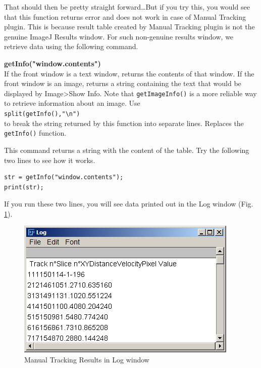 \documentclass[11pt,a4paper,oneside]{report}
\newenvironment{indentCom}%
{\begin{list}{}%
         {\setlength{\leftmargin}{1em}}%
         \item[]%
}
{\end{list}}
\newcommand{\ilcom}[1]{\texttt{\small#1}}
\begin{document}
That should then be pretty straight forward\ldots But if you try this, you would see that this function returns error and does not work in case of Manual Tracking plugin. This is because result table created by Manual Tracking plugin is not the genuine ImageJ Results window. For such non-genuine results window, we retrieve data using the following command. 
\begin{indentCom}
\textbf{getInfo("window.contents")}\\
If the front window is a text window, returns the contents of that window. If the front window is an image, returns a string containing the text that would be displayed by Image>Show Info. Note that \ilcom{getImageInfo()} is a more reliable way to retrieve information about an image. Use \\
\ilcom{split(getInfo(),"\textbackslash{}n")} \\
to break the string returned by this function into separate lines. Replaces the \ilcom{getInfo()} function.
\end{indentCom}

This command returns a string with the content of the table. Try the following two lines to see how it works. \\

\begin{lstlisting}[numbers=none, morekeywords={*, getInfo}]
str = getInfo("window.contents");
print(str);
\end{lstlisting}
If you run these two lines, you will see data printed out in the Log window (Fig. \ref{fig:manualtrackingresultsLog}). 
\begin{figure}[htbp]
\begin{center}
\includegraphics[scale=0.6]{fig/fig253_AllValuesinLog.png}
\caption{Manual Tracking Results in Log window}
\label{fig:manualtrackingresultsLog}
\end{center}
\end{figure}
\end{document}
